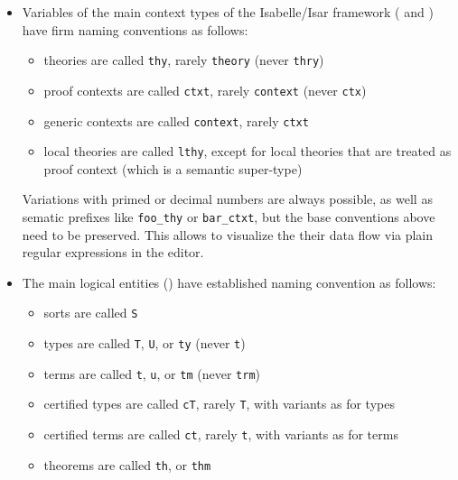 \begin{isabellebody}
\begin{isamarkuptext}
\begin{itemize}
  \item Variables of the main context types of the Isabelle/Isar
  framework ( and ) have
  firm naming conventions as follows:

  \begin{itemize}

  \item theories are called \verb|thy|, rarely \verb|theory|
  (never \verb|thry|)

  \item proof contexts are called \verb|ctxt|, rarely \verb|context| (never \verb|ctx|)

  \item generic contexts are called \verb|context|, rarely
  \verb|ctxt|

  \item local theories are called \verb|lthy|, except for local
  theories that are treated as proof context (which is a semantic
  super-type)

  \end{itemize}

  Variations with primed or decimal numbers are always possible, as
  well as sematic prefixes like \verb|foo_thy| or \verb|bar_ctxt|, but the base conventions above need to be preserved.
  This allows to visualize the their data flow via plain regular
  expressions in the editor.

  \item The main logical entities () have established
  naming convention as follows:

  \begin{itemize}

  \item sorts are called \verb|S|

  \item types are called \verb|T|, \verb|U|, or \verb|ty| (never \verb|t|)

  \item terms are called \verb|t|, \verb|u|, or \verb|tm| (never \verb|trm|)

  \item certified types are called \verb|cT|, rarely \verb|T|, with variants as for types

  \item certified terms are called \verb|ct|, rarely \verb|t|, with variants as for terms

  \item theorems are called \verb|th|, or \verb|thm|


\end{itemize}
\end{itemize}
\end{isamarkuptext}
\end{isabellebody}
